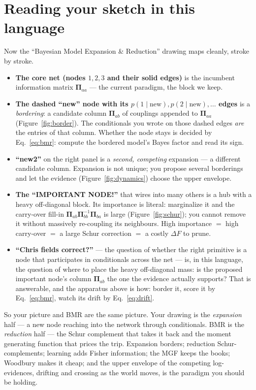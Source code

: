 \documentclass[11pt]{article}
\newcommand{\Prec}{\bm{\Pi}}        %
\theoremstyle{definition}
\begin{document}
\section{Reading your sketch in this language}

Now the ``Bayesian Model Expansion \& Reduction'' drawing maps cleanly,
stroke by stroke.

\begin{itemize}
\item \textbf{The core net (nodes $1,2,3$ and their solid edges)} is the
incumbent information matrix $\Prec_{aa}$ --- the current paradigm, the
block we keep.
\item \textbf{The dashed ``new'' node with its $p(1\mid\text{new}),
p(2\mid\text{new}),\dots$ edges} is a \emph{bordering}: a candidate column
$\Prec_{ab}$ of couplings appended to $\Prec_{aa}$
(Figure~\ref{fig:border}). The conditionals you wrote on those dashed
edges \emph{are} the entries of that column. Whether the node stays is
decided by Eq.~\eqref{eq:bmr}: compute the bordered model's Bayes factor
and read its sign.
\item \textbf{``new2''} on the right panel is a \emph{second, competing}
expansion --- a different candidate column. Expansion is not unique;
you propose several borderings and let the evidence
(Figure~\ref{fig:dynamics}) choose the upper envelope.
\item \textbf{The ``IMPORTANT NODE!''} that wires into many others is a hub
with a heavy off-diagonal block. Its importance is literal: marginalize it
and the carry-over fill-in $\Prec_{ab}\Prec_{bb}^{-1}\Prec_{ba}$ is large
(Figure~\ref{fig:schur}); you cannot remove it without massively
re-coupling its neighbours. High importance $=$ high carry-over $=$ a
large Schur correction $=$ a costly $\Delta F$ to prune.
\item \textbf{``Chris fields correct?''} --- the question of whether the
right primitive is a node that participates in conditionals across the net
--- is, in this language, the question of where to place the heavy
off-diagonal mass: is the proposed important node's column $\Prec_{ab}$
the one the evidence actually supports? That is answerable, and the
apparatus above is how: border it, score it by Eq.~\eqref{eq:bmr}, watch
its drift by Eq.~\eqref{eq:drift}.
\end{itemize}

So your picture and BMR are the same picture. Your drawing is the
\emph{expansion} half --- a new node reaching into the network through
conditionals. BMR is the \emph{reduction} half --- the Schur complement
that takes it back and the moment generating function that prices the
trip. Expansion borders; reduction Schur-complements; learning adds Fisher
information; the MGF keeps the books; Woodbury makes it cheap; and the
upper envelope of the competing log-evidences, drifting and crossing as
the world moves, is the paradigm you should be holding.
\end{document}
